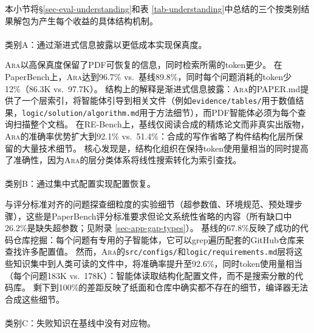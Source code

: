 \documentclass[
]{article}
\makeatletter
\let\oldparagraph\paragraph
\renewcommand{\paragraph}{
    \@ifstar
      \xxxParagraphStar
      \xxxParagraphNoStar
  }
\newcommand{\xxxParagraphStar}[1]{\oldparagraph*{#1}\mbox{}}
\newcommand{\xxxParagraphNoStar}[1]{\oldparagraph{#1}\mbox{}}
\newcommand{\passthrough}[1]{#1}
\theoremstyle{definition}
\newcommand{\ara}{\textsc{Ara}}
\makeatother
\begin{document}
本小节将\S\ref{sec-eval-understanding}和表
\ref{tab-understanding}中总结的三个按类别结果解包为产生每个收益的具体结构机制。

\paragraph{类别A：通过渐进式信息披露以更低成本实现保真度。}\label{ux7c7bux522baux901aux8fc7ux6e10ux8fdbux5f0fux4fe1ux606fux62abux9732ux4ee5ux66f4ux4f4eux6210ux672cux5b9eux73b0ux4fddux771fux5ea6}

\ara{}以高保真度保留了PDF可恢复的信息，同时检索所需的token更少。
在PaperBench上，\ara{}达到96.7\%
vs.~基线89.8\%，同时每个问题消耗的token少12\%（86.3K vs.~97.7K）。
结构上的解释是渐进式信息披露：\ara{}的PAPER.md提供了一个层索引，将智能体引导到相关文件（例如\passthrough{\lstinline!evidence/tables/!}用于数值结果，\passthrough{\lstinline!logic/solution/algorithm.md!}用于方法细节），而PDF智能体必须为每个查询扫描整个文档。
在RE-Bench上，基线仅阅读合成的精炼论文而非真实出版物，\ara{}的准确率优势扩大到92.1\%
vs.~51.4\%：合成的写作省略了构件结构化层所保留的大量技术细节。
核心发现是，结构化组织在保持token使用量相当的同时提高了准确性，因为\ara{}的层分类体系将线性搜索转化为索引查找。

\paragraph{类别B：通过集中式配置实现配置恢复。}\label{ux7c7bux522bbux901aux8fc7ux96c6ux4e2dux5f0fux914dux7f6eux5b9eux73b0ux914dux7f6eux6062ux590d}

与评分标准对齐的问题探查细粒度的实验细节（超参数值、环境规范、预处理步骤），这些是PaperBench评分标准要求但论文系统性省略的内容（所有缺口中26.2\%是缺失超参数；见附录
\ref{sec-app-gap-types}）。
基线的67.8\%反映了成功的代码仓库挖掘：每个问题有专用的子智能体，它可以grep遍历配套的GitHub仓库来查找许多配置值。
然而，\ara{}的\passthrough{\lstinline!src/configs/!}和\passthrough{\lstinline!logic/requirements.md!}层将这些知识集中到人类可读的文件中，将准确率提升至92.6\%，同时token使用量相当（每个问题183K
vs.~178K）：智能体读取结构化配置文件，而不是搜索分散的代码库。
剩下到100\%的差距反映了纸面和仓库中确实都不存在的细节，编译器无法合成这些细节。

\paragraph{类别C：失败知识在基线中没有对应物。}\label{ux7c7bux522bcux5931ux8d25ux77e5ux8bc6ux5728ux57faux7ebfux4e2dux6ca1ux6709ux5bf9ux5e94ux7269}
\end{document}
